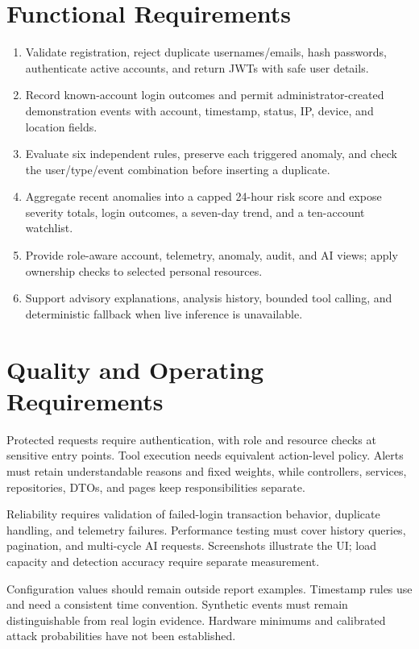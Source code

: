 \clearpage\section{Functional Requirements}
\begin{enumerate}
\item Validate registration, reject duplicate usernames/emails, hash passwords, authenticate active accounts, and return JWTs with safe user details.
\item Record known-account login outcomes and permit administrator-created demonstration events with account, timestamp, status, IP, device, and location fields.
\item Evaluate six independent rules, preserve each triggered anomaly, and check the user/type/event combination before inserting a duplicate.
\item Aggregate recent anomalies into a capped 24-hour risk score and expose severity totals, login outcomes, a seven-day trend, and a ten-account watchlist.
\item Provide role-aware account, telemetry, anomaly, audit, and AI views; apply ownership checks to selected personal resources.
\item Support advisory explanations, analysis history, bounded tool calling, and deterministic fallback when live inference is unavailable.
\end{enumerate}

\section{Quality and Operating Requirements}
Protected requests require authentication, with role and resource checks at sensitive entry points. Tool execution needs equivalent action-level policy. Alerts must retain understandable reasons and fixed weights, while controllers, services, repositories, DTOs, and pages keep responsibilities separate.

Reliability requires validation of failed-login transaction behavior, duplicate handling, and telemetry failures. Performance testing must cover history queries, pagination, and multi-cycle AI requests. Screenshots illustrate the UI; load capacity and detection accuracy require separate measurement.

Configuration values should remain outside report examples. Timestamp rules use  and need a consistent time convention. Synthetic events must remain distinguishable from real login evidence. Hardware minimums and calibrated attack probabilities have not been established.
